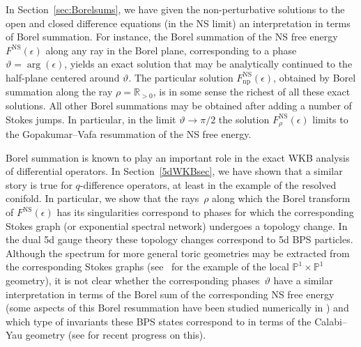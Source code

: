 \documentclass[pdftex]{sigma}
\numberwithin{equation}{section}
\begin{document}
In Section~\ref{sec:Borelsums}, we have given the non-perturbative solutions to the open and closed difference equations (in the NS limit) an interpretation in terms of Borel summation. For instance, the Borel summation of the NS free energy $F^{\mathrm{NS}}(\epsilon)$ along any ray in the Borel plane, corresponding to a phase $\vartheta = \arg(\epsilon)$, yields an exact solution that may be analytically continued to the half-plane centered around $\vartheta$. The particular solution $F^{\mathrm{NS}}_\mathrm{np}(\epsilon)$, obtained by Borel summation along the ray $\rho = \mathbb{R}_{>0}$, is in some sense the richest of all these exact solutions. All other Borel summations may be obtained after adding a number of Stokes jumps. In particular, in the limit $\vartheta \to \pi/2$ the solution $F^{\mathrm{NS}}_\rho(\epsilon)$ limits to the Gopakumar--Vafa resummation of the NS free energy.

Borel summation is known to play an important role in the exact WKB analysis of differential operators. In Section~\ref{5dWKBsec}, we have shown that a similar story is true for $q$-difference operators, at least in the example of the resolved conifold. In particular, we show that the rays~$\rho$ along which the Borel transform of $F^{\mathrm{NS}}(\epsilon)$ has its singularities correspond to phases for which the corresponding Stokes graph (or exponential spectral network) undergoes a topology change. In the dual 5d gauge theory these topology changes correspond to 5d BPS particles. Although the spectrum for more general toric geometries may be extracted from the corresponding Stokes graphs (see~\cite{Banerjee:2020moh} for the example of the local $\mathbb{P}^1 \times \mathbb{P}^1$ geometry), it is not clear whether the corresponding phases~$\vartheta$ have a similar interpretation in terms of the Borel sum of the corresponding NS free energy (some aspects of this Borel resummation have been studied numerically in \cite{Grassi:2014cla}) and which type of invariants these BPS states correspond to in terms of the Calabi--Yau geometry (see \cite{Banerjee:2022oed} for recent progress on this).
\end{document}
